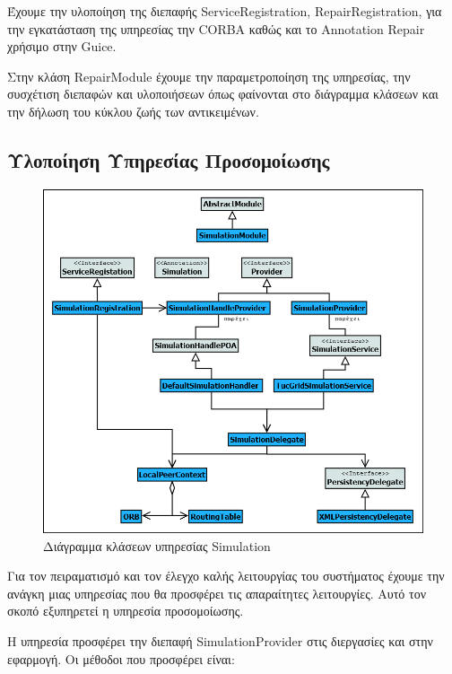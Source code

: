 Έχουμε την υλοποίηση της διεπαφής ServiceRegistration, 
RepairRegistration, για την εγκατάσταση της υπηρεσίας την CORBA καθώς 
και το Annotation Repair χρήσιμο στην Guice.

Στην κλάση RepairModule έχουμε την παραμετροποίηση της 
υπηρεσίας, την συσχέτιση διεπαφών και υλοποιήσεων όπως φαίνονται στο 
διάγραμμα κλάσεων και την δήλωση του κύκλου ζωής των αντικειμένων.

\subsection{Υλοποίηση Υπηρεσίας Προσομοίωσης}

\begin{figure}[htbp]
  \begin{center}
    \includegraphics[width=\textwidth]{Figures/Architecture/Service_Layer/SimulationService_ClassDiagram.png}
  \end{center}
  \caption{Διάγραμμα κλάσεων υπηρεσίας Simulation}
  \label{fig:SimulationService}
\end{figure}

Για τον πειραματισμό και τον έλεγχο καλής λειτουργίας του 
συστήματος έχουμε την ανάγκη μιας υπηρεσίας που θα προσφέρει τις 
απαραίτητες λειτουργίες. Αυτό τον σκοπό εξυπηρετεί η υπηρεσία 
προσομοίωσης. 

Η υπηρεσία προσφέρει την διεπαφή SimulationProvider στις διεργασίες και 
στην εφαρμογή. Οι μέθοδοι που προσφέρει είναι:

